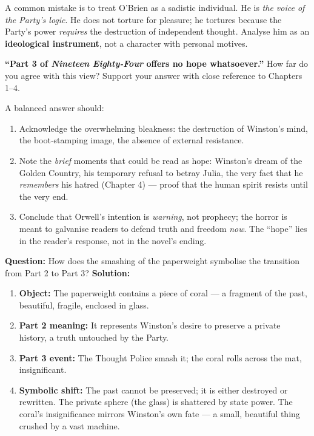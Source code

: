 \documentclass[11pt]{article}
\begin{document}
\begin{attention}
A common mistake is to treat O’Brien as a sadistic individual. He is \emph{the voice of the Party’s logic}. He does not torture for pleasure; he tortures because the Party’s power \emph{requires} the destruction of independent thought. Analyse him as an \textbf{ideological instrument}, not a character with personal motives.
\end{attention}

\begin{exercice}
\textbf{“Part 3 of \emph{Nineteen Eighty‑Four} offers no hope whatsoever.”} How far do you agree with this view? Support your answer with close reference to Chapters 1–4.
\end{exercice}

\begin{corrige}[Exercise 1]
A balanced answer should:
\begin{enumerate}
\item Acknowledge the overwhelming bleakness: the destruction of Winston’s mind, the boot‑stamping image, the absence of external resistance.
\item Note the \emph{brief} moments that could be read as hope: Winston’s dream of the Golden Country, his temporary refusal to betray Julia, the very fact that he \emph{remembers} his hatred (Chapter 4) — proof that the human spirit resists until the very end.
\item Conclude that Orwell’s intention is \emph{warning}, not prophecy; the horror is meant to galvanise readers to defend truth and freedom \emph{now}. The “hope” lies in the reader’s response, not in the novel’s ending.
\end{enumerate}
\end{corrige}

\begin{exoresolu}
\textbf{Question:} How does the smashing of the paperweight symbolise the transition from Part 2 to Part 3?
\textbf{Solution:}
\begin{enumerate}
\item \textbf{Object:} The paperweight contains a piece of coral — a fragment of the past, beautiful, fragile, enclosed in glass.
\item \textbf{Part 2 meaning:} It represents Winston’s desire to preserve a private history, a truth untouched by the Party.
\item \textbf{Part 3 event:} The Thought Police smash it; the coral rolls across the mat, insignificant.
\item \textbf{Symbolic shift:} The past cannot be preserved; it is either destroyed or rewritten. The private sphere (the glass) is shattered by state power. The coral’s insignificance mirrors Winston’s own fate — a small, beautiful thing crushed by a vast machine.
\end{enumerate}
\end{exoresolu}
\end{document}
